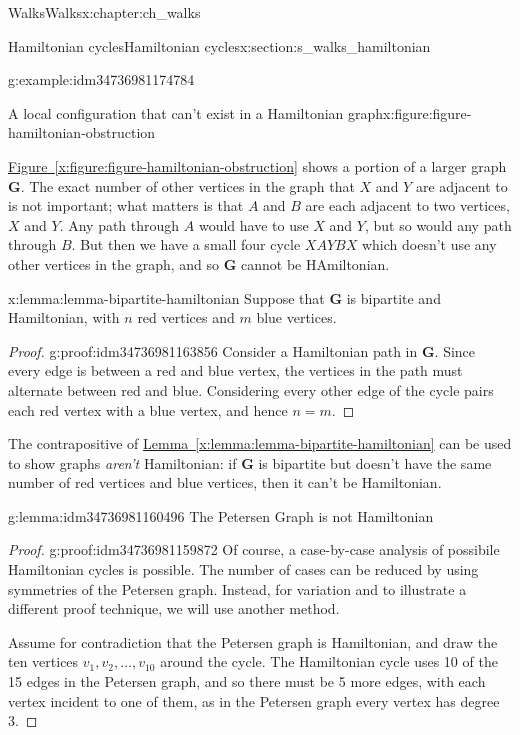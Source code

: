 \documentclass[oneside,10pt,]{book}
\newcommand{\xreffont}{\relax}
\numberwithin{equation}{section}
\newcommand{\bfG}{\mathbf{G}}
\begin{document}
\begin{chapterptx}{Walks}{}{Walks}{}{}{x:chapter:ch_walks}
\begin{sectionptx}{Hamiltonian cycles}{}{Hamiltonian cycles}{}{}{x:section:s_walks_hamiltonian}
\begin{example}{}{g:example:idm34736981174784}
\begin{figureptx}{A local configuration that can't exist in a Hamiltonian graph}{x:figure:figure-hamiltonian-obstruction}{}
\begin{image}{0.15}{0.7}{0.15}
{\begin{tikzpicture}
\end{tikzpicture}
}%
\end{image}%
\tcblower
\end{figureptx}%
\hyperref[x:figure:figure-hamiltonian-obstruction]{Figure~{\xreffont\ref{x:figure:figure-hamiltonian-obstruction}}} shows a portion of a larger graph \(\bfG\).  The exact number of other vertices in the graph that \(X\) and \(Y\) are adjacent to is not important; what matters is that \(A\) and \(B\) are each adjacent to two vertices, \(X\) and \(Y\).  Any path through \(A\) would have to use \(X\) and \(Y\), but so would any path through \(B\).  But then we have a small four cycle \(XAYBX\) which doesn't use any other vertices in the graph, and so \(\bfG\) cannot be HAmiltonian.%
\end{example}
\begin{lemma}{}{}{x:lemma:lemma-bipartite-hamiltonian}%
Suppose that \(\bfG\) is bipartite and Hamiltonian, with \(n\) red vertices and \(m\) blue vertices.%
\end{lemma}
\begin{proof}{}{g:proof:idm34736981163856}
Consider a Hamiltonian path in \(\bfG\).  Since every edge is between a red and blue vertex, the vertices in the path must alternate between red and blue.  Considering every other edge of the cycle pairs each red vertex with a blue vertex, and hence \(n=m\).%
\end{proof}
The contrapositive of \hyperref[x:lemma:lemma-bipartite-hamiltonian]{Lemma~{\xreffont\ref{x:lemma:lemma-bipartite-hamiltonian}}} can be used to show graphs \emph{aren't} Hamiltonian: if \(\bfG\) is bipartite but doesn't have the same number of red vertices and blue vertices, then it can't be Hamiltonian.%
\begin{lemma}{}{}{g:lemma:idm34736981160496}%
The Petersen Graph is not Hamiltonian%
\end{lemma}
\begin{proof}{}{g:proof:idm34736981159872}
Of course, a case-by-case analysis of possibile Hamiltonian cycles is possible.  The number of cases can be reduced by using symmetries of the Petersen graph. Instead, for variation and to illustrate a different proof technique, we will use another method.%
\par
Assume for contradiction that the Petersen graph is Hamiltonian, and draw the ten vertices \(v_1,v_2,\dots,v_{10}\) around the cycle.  The Hamiltonian cycle uses 10 of the 15 edges in the Petersen graph, and so there must be 5 more edges, with each vertex incident to one of them, as in the Petersen graph every vertex has degree 3.%

\end{proof}
\end{sectionptx}
\end{chapterptx}
\end{document}
